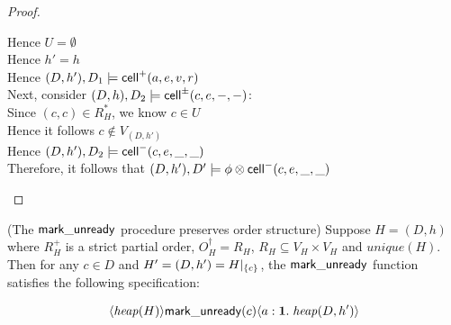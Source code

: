 \begin{proof}
\begin{tabbedproof}
\ooooo Hence $U = \emptyset$ \\
\ooooo Hence $h' = h$ \\
\ooooo Hence $(D,h'), D_1 \models \mathsf{cell}^{+}({a}, {e}, {v}, {r})$ \\
\oo Next, consider $(D,h), D_2 \models \mathsf{cell}^{\pm}({c}, {e}, {-}, {-})$: \\
\ooo Since $(c, c) \in R^*_H$,  we know $c \in U$ \\
\ooo Hence it follows $c \not\in V_{(D, h')}$ \\
\ooo Hence $(D,h'), D_2 \models \mathsf{cell}^{-}({c}, {e}, {\_}, {\_})$ \\
\oo Therefore, it follows that $(D,h'), D' \models \phi \otimes \mathsf{cell}^{-}({c}, {e}, {\_}, {\_})$ \\ 
\end{tabbedproof}
\end{proof}


\begin{lemma}{(The $\mathsf{mark\_unready}$ procedure preserves order structure)}
Suppose $H = (D,h)$ where $R^+_H$ is a strict partial order,
$O^\dagger_H = R_H$, $R_H \subseteq V_H \times V_H$ and
$\mathit{unique}(H)$. Then for any $c \in D$ and $H' = (D, h') =
H|_{\{{c}\}}$, the $\mathsf{mark\_unready}$ function satisfies the following specification:

\begin{displaymath}
\langle{\mathit{heap}(H)}\rangle{\mathsf{mark\_unready}(c)}\langle{a:\mathbf{1}}.\;{\mathit{heap}(D,h')}\rangle
\end{displaymath}
  
\end{lemma}


